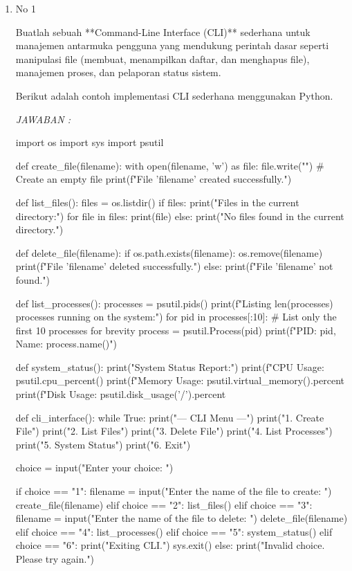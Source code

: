 \documentclass[12pt]{article}
\begin{document}
\begin{enumerate}


    \item No 1

    
    Buatlah sebuah **Command-Line Interface (CLI)** sederhana untuk manajemen antarmuka pengguna yang mendukung perintah dasar seperti manipulasi file (membuat, menampilkan daftar, dan menghapus file), manajemen proses, dan pelaporan status sistem.

Berikut adalah contoh implementasi CLI sederhana menggunakan Python.

\textit{JAWABAN : }
\begin{python}
import os
import sys
import psutil

def create_file(filename):
    with open(filename, 'w') as file:
        file.write("")  # Create an empty file
    print(f"File '{filename}' created successfully.")

def list_files():
    files = os.listdir()
    if files:
        print("Files in the current directory:")
        for file in files:
            print(file)
    else:
        print("No files found in the current directory.")

def delete_file(filename):
    if os.path.exists(filename):
        os.remove(filename)
        print(f"File '{filename}' deleted successfully.")
    else:
        print(f"File '{filename}' not found.")

def list_processes():
    processes = psutil.pids()
    print(f"Listing {len(processes)} processes running on the system:")
    for pid in processes[:10]:  # List only the first 10 processes for brevity
        process = psutil.Process(pid)
        print(f"PID: {pid}, Name: {process.name()}")

def system_status():
    print("System Status Report:")
    print(f"CPU Usage: {psutil.cpu_percent()}%
    print(f"Memory Usage: {psutil.virtual_memory().percent}%
    print(f"Disk Usage: {psutil.disk_usage('/').percent}%

def cli_interface():
    while True:
        print("\n--- CLI Menu ---")
        print("1. Create File")
        print("2. List Files")
        print("3. Delete File")
        print("4. List Processes")
        print("5. System Status")
        print("6. Exit")

        choice = input("Enter your choice: ")

        if choice == "1":
            filename = input("Enter the name of the file to create: ")
            create_file(filename)
        elif choice == "2":
            list_files()
        elif choice == "3":
            filename = input("Enter the name of the file to delete: ")
            delete_file(filename)
        elif choice == "4":
            list_processes()
        elif choice == "5":
            system_status()
        elif choice == "6":
            print("Exiting CLI.")
            sys.exit()
        else:
            print("Invalid choice. Please try again.")


\end{python}
\end{enumerate}
\end{document}

